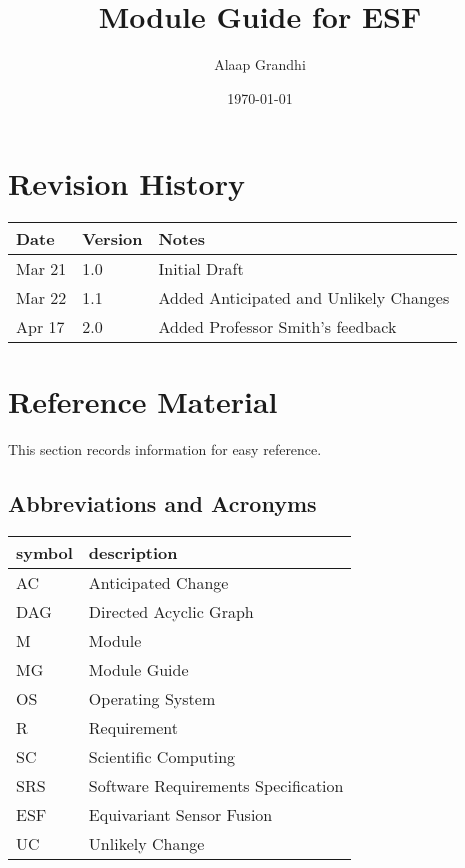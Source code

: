 \documentclass[12pt, titlepage]{article}
\newcommand{\ProjectName}{ESF }
\begin{document}
\title{Module Guide for \ProjectName} 
\author{Alaap Grandhi}
\date{\today}

\maketitle


\section{Revision History}

\begin{tabularx}{\textwidth}{p{3cm}p{2cm}X}
\toprule {\bf Date} & {\bf Version} & {\bf Notes}\\
\midrule
Mar 21 & 1.0 & Initial Draft\\
Mar 22 & 1.1 & Added Anticipated and Unlikely Changes\\
Apr 17 & 2.0 & Added Professor Smith's feedback\\
\bottomrule
\end{tabularx}

\newpage

\section{Reference Material}

This section records information for easy reference.

\subsection{Abbreviations and Acronyms}

\renewcommand{\arraystretch}{1.2}
\begin{tabular}{l l} 
  \toprule		
  \textbf{symbol} & \textbf{description}\\
  \midrule 
  AC & Anticipated Change\\
  DAG & Directed Acyclic Graph \\
  M & Module \\
  MG & Module Guide \\
  OS & Operating System \\
  R & Requirement\\
  SC & Scientific Computing \\
  SRS & Software Requirements Specification\\
  \ProjectName & Equivariant Sensor Fusion\\
  UC & Unlikely Change \\
  \bottomrule
\end{tabular}\\
\end{document}
